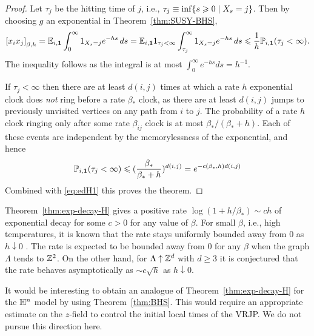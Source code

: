 \documentclass[11pt,a4paper]{article}
\begin{document}
\begin{proof}
  Let $\tau_{j}$ be the hitting time of $j$, i.e.,
  $\tau_{j} \equiv \inf \{s\geqslant 0 \mid X_{s}=j\}$.
  Then by choosing $g$ an exponential in Theorem~\ref{thm:SUSY-BHS},
  \begin{equation}
      \label{eq:edH1}
    \cb{x_ix_j}_{\beta,h}
    =\E_{i,\V{1}} \int_{0}^{\infty}1_{X_{s}=j}e^{-hs}\,ds
      =\E_{i,\V{1}}1_{\tau_{j}<\infty}\int_{\tau_{j}}^{\infty}1_{X_{s}=j} e^{-hs}\,ds
       \leq \frac{1}{h} \P_{i,\V{1}}(\tau_{j}<\infty).
  \end{equation}
  The inequality follows as the integral is at most
  $\int_{0}^{\infty}e^{-hs}ds = h^{-1}$.

  If $\tau_{j}<\infty$ then there are at least $d(i,j)$ times at which
  a rate $h$ exponential clock does \emph{not} ring before a rate
  $\beta_*$ clock, as there are at least $d(i,j)$ jumps to previously
  unvisited vertices on any path from $i$ to $j$. The probability of a
  rate $h$ clock ringing only after some rate $\beta_{ij}$ clock is
  at most $\beta_*/(\beta_*+h)$. Each of these events are independent by the
  memorylessness of the exponential, and hence
  \begin{equation*}
    \mathbb{P}_{i,\boldsymbol{1}}(\tau_{j}<\infty) \leqslant (\frac{\beta_*}{\beta_*+h})^{d(i,j)}
    = e^{-c(\beta_*,h)d(i,j)}
  \end{equation*}
  Combined with \eqref{eq:edH1} this proves the theorem.
\end{proof}

\begin{remark}
  Theorem~\ref{thm:exp-decay-H} gives a positive rate
  $\log(1+h/\beta_*)\sim ch$ of exponential decay for some $c>0$ for
  any value of $\beta$. For small $\beta$, i.e., high temperatures, it
  is known that the rate stays uniformly bounded away from $0$ as
  $h\downarrow 0$ \cite{MR2736958,MR3189433}.  The rate is expected to
  be bounded away from $0$ for any $\beta$ when the graph $\Lambda$
  tends to $\mathbb{Z}^2$.  On the other hand, for $\Lambda \uparrow \mathbb{Z}^d$
  with $d\geq 3$ it is conjectured that the rate behaves
  asymptotically as $\sim c\sqrt{h}$ as $h\downarrow 0$.
\end{remark}


It would be interesting to obtain an analogue of
Theorem~\ref{thm:exp-decay-H} for the $\mathbb{H}^{n}$ model by using
Theorem~\ref{thm:BHS}. This would require an appropriate estimate on
the $z$-field to control the initial local times of the VRJP. We
do not pursue this direction here.
\end{document}
